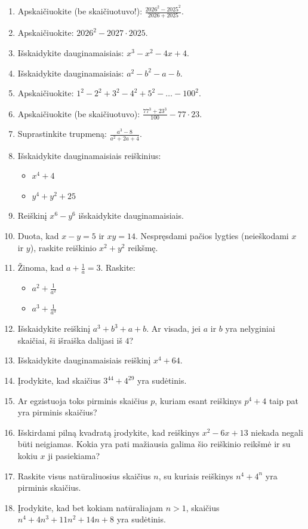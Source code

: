\documentclass[11pt,a4paper]{scrartcl}
\begin{document}
\begin{enumerate}
    \renewcommand{\labelenumi}{\textbf{\theenumi.}}
    
    \item Apskaičiuokite (be skaičiuotuvo!): $\frac{2026^2 - 2025^2}{2026 + 2025}$.
    \item Apskaičiuokite: $2026^2 - 2027 \cdot 2025$.
    \item Išskaidykite dauginamaisiais: $x^3 - x^2 - 4x + 4$.
    \item Išskaidykite dauginamaisiais: $a^2 - b^2 - a - b$.
    
    \item Apskaičiuokite: $1^2 - 2^2 + 3^2 - 4^2 + 5^2 - \dots - 100^2$.
    \item Apskaičiuokite (be skaičiuotuvo): $\frac{77^3 + 23^3}{100} - 77 \cdot 23$.
    \item Suprastinkite trupmeną: $\frac{a^3 - 8}{a^2 + 2a + 4}$.
    \item Išskaidykite dauginamaisiais reiškinius:
    \begin{itemize}
        \item[a)] $x^4 + 4$ 
        \item[b)] $y^4 + y^2 + 25$
    \end{itemize}
    \item Reiškinį $x^6 - y^6$ išskaidykite dauginamaisiais.
    
    \item Duota, kad $x - y = 5$ ir $xy = 14$. Nespręsdami pačios lygties (neieškodami $x$ ir $y$), raskite reiškinio $x^2 + y^2$ reikšmę.
    \item Žinoma, kad $a + \frac{1}{a} = 3$. Raskite:
    \begin{itemize}
        \item[a)] $a^2 + \frac{1}{a^2}$
        \item[b)] $a^3 + \frac{1}{a^3}$
    \end{itemize}
    \item Išskaidykite reiškinį $a^3 + b^3 + a + b$. Ar visada, jei $a$ ir $b$ yra nelyginiai skaičiai, ši išraiška dalijasi iš $4$?
    
    \item Išskaidykite dauginamaisiais reiškinį $x^4 + 64$.
    \item Įrodykite, kad skaičius $3^{44} + 4^{29}$ yra sudėtinis.
    \item Ar egzistuoja toks pirminis skaičius $p$, kuriam esant reiškinys $p^4 + 4$ taip pat yra pirminis skaičius?
    \item Išskirdami pilną kvadratą įrodykite, kad reiškinys $x^2 - 6x + 13$ niekada negali būti neigiamas. Kokia yra pati mažiausia galima šio reiškinio reikšmė ir su kokiu $x$ ji pasiekiama?
    \item Raskite visus natūraliuosius skaičius $n$, su kuriais reiškinys $n^4 + 4^n$ yra pirminis skaičius.
    \item Įrodykite, kad bet kokiam natūraliajam $n > 1$, skaičius $n^4 + 4n^3 + 11n^2 + 14n + 8$ yra sudėtinis.
\end{enumerate}
\end{document}
